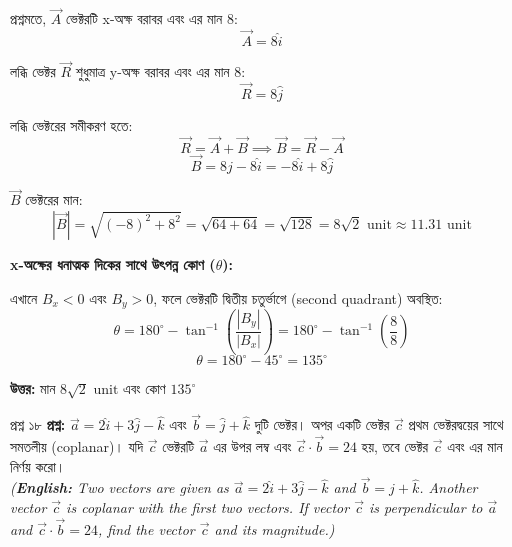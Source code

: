 \documentclass[11pt,a4paper]{article}
\begin{document}
\begin{solbox}
\begin{solbox}
\begin{center}
\end{center}

প্রশ্নমতে, $\vec{A}$ ভেক্টরটি x-অক্ষ বরাবর এবং এর মান $8$:
$$\vec{A} = 8\hat{i}$$

লব্ধি ভেক্টর $\vec{R}$ শুধুমাত্র y-অক্ষ বরাবর এবং এর মান $8$:
$$\vec{R} = 8\hat{j}$$

লব্ধি ভেক্টরের সমীকরণ হতে:
$$\vec{R} = \vec{A} + \vec{B} \implies \vec{B} = \vec{R} - \vec{A}$$
$$\vec{B} = 8\hat{j} - 8\hat{i} = -8\hat{i} + 8\hat{j}$$

$\vec{B}$ ভেক্টরের মান:
$$|\vec{B}| = \sqrt{(-8)^2 + 8^2} = \sqrt{64 + 64} = \sqrt{128} = 8\sqrt{2}\text{ unit} \approx 11.31\text{ unit}$$

\textbf{x-অক্ষের ধনাত্মক দিকের সাথে উৎপন্ন কোণ ($\theta$):}

এখানে $B_x < 0$ এবং $B_y > 0$, ফলে ভেক্টরটি দ্বিতীয় চতুর্ভাগে (second quadrant) অবস্থিত:
$$\theta = 180^\circ - \tan^{-1}\left(\frac{|B_y|}{|B_x|}\right) = 180^\circ - \tan^{-1}\left(\frac{8}{8}\right)$$
$$\theta = 180^\circ - 45^\circ = 135^\circ$$

\textbf{উত্তর:} মান $8\sqrt{2}\text{ unit}$ এবং কোণ $135^\circ$
\end{solbox}

\vspace{0.4cm}

\begin{qbox}{প্রশ্ন ১৮}
\textbf{প্রশ্ন:} $\vec{a} = 2\hat{i} + 3\hat{j} - \hat{k}$ এবং $\vec{b} = \hat{j} + \hat{k}$ দুটি ভেক্টর। অপর একটি ভেক্টর $\vec{c}$ প্রথম ভেক্টরদ্বয়ের সাথে সমতলীয় (coplanar)। যদি $\vec{c}$ ভেক্টরটি $\vec{a}$ এর উপর লম্ব এবং $\vec{c} \cdot \vec{b} = 24$ হয়, তবে ভেক্টর $\vec{c}$ এবং এর মান নির্ণয় করো। \\
\textit{(\textbf{English:} Two vectors are given as $\vec{a} = 2\hat{i} + 3\hat{j} - \hat{k}$ and $\vec{b} = \hat{j} + \hat{k}$. Another vector $\vec{c}$ is coplanar with the first two vectors. If vector $\vec{c}$ is perpendicular to $\vec{a}$ and $\vec{c} \cdot \vec{b} = 24$, find the vector $\vec{c}$ and its magnitude.)}
\end{qbox}


\end{solbox}
\end{document}
